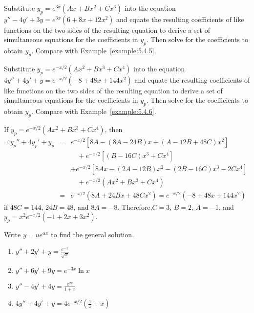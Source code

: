 \documentclass{ximera}
\begin{document}
\begin{problem}\label{exer:5.4.35}
Substitute $y_p=e^{3x}(Ax+Bx^2+Cx^3)$ into the equation $y''-4y'+3y=e^{3x}(6+8x+12x^2)$ and equate the resulting coefficients of like functions on the two sides of the resulting equation to derive a set of simultaneous equations for the coefficients in $y_p$. Then
solve for the coefficients to obtain $y_p$.
Compare with Example~\ref{example:5.4.5}.
\end{problem}

\begin{problem}\label{exer:5.4.36}
Substitute $y_p=e^{-x/2}(Ax^2+Bx^3+Cx^4)$ into the equation $4y''+4y'+y=e^{-x/2}(-8+48x+144x^2)$ and equate the resulting coefficients of like functions on the two sides of the resulting equation to derive a set of simultaneous equations for the coefficients in $y_p$. Then
solve for the coefficients to obtain $y_p$.
Compare with Example~\ref{example:5.4.6}.
\begin{solution}
If $y_p=e^{-x/2}(Ax^2+Bx^3+Cx^4)$, then
\begin{eqnarray*}
4y_p''+4y_p'+y_p&=&e^{-x/2}[8A-(8A-24B)x+(A-12B+48C)x^2]\\
 &&\quad+e^{-x/2}[(B-16C)x^3+Cx^4]\\
&&+e^{-x/2}[8Ax-(2A-12B)x^2-(2B-16C)x^3-2Cx^4]\\
&&\quad+e^{-x/2}(Ax^2+Bx^3+Cx^4)\\ &=&e^{-x/2}(8A+24Bx+48Cx^2)=
e^{-x/2}(-8+48x+144x^2)
\end{eqnarray*}
if $48C=144$, $24B=48$, and $8A=-8$. Therefore,$C=3$, $B=2$, $A=-1$,
and $y_p=x^2e^{-x/2}(-1+2x+3x^2)$.
\end{solution}
\end{problem}

\begin{problem}\label{exer:5.4.37}
Write $y=ue^{\alpha x}$ to find the general
solution.

\begin{enumerate}
\item $y''+2y'+y=\frac{e^{-x}}{\sqrt x}$ 

\item $y''+6y'+9y=e^{-3x}\ln x$

\item $y''-4y'+4y=\frac{e^{2x}}{1+x}$ 

\item $4y''+4y'+y=4e^{-x/2}\left(\frac{1}{x}+x\right)$

\end{enumerate}
\end{problem}
\end{document}
